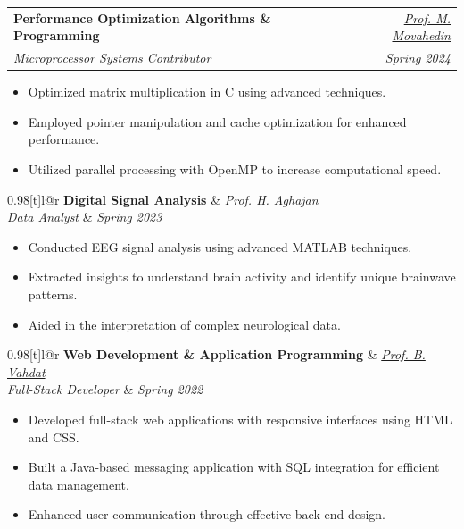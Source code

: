 \documentclass[a4paper,11pt]{article}
\makeatletter
\newcommand{\resumeSubheading}[4]{
\vspace{0.5mm}\item
    \begin{tabular*}{0.98\textwidth}[t]{l@{\extracolsep{\fill}}r}
        \textbf{#1} & \textit{\footnotesize{#4}} \\
        \textit{\footnotesize{#3}} &  \footnotesize{#2}\\
    \end{tabular*}
    \vspace{-2.4mm}
}
\newcommand{\resumeItemListStart}{\begin{justify}\begin{itemize}[leftmargin=3ex, rightmargin=2ex, noitemsep,labelsep=1.2mm,itemsep=0mm]\small}
\newcommand{\resumeItemListEnd}{\end{itemize}\end{justify}\vspace{-2mm}}
\makeatother
\begin{document}
    \vspace{-4.5mm}
    
    \resumeSubheading
      {Performance Optimization Algorithms \& Programming}{\textit{Spring 2024}}
      {Microprocessor Systems Contributor}{\textcolor{MidnightBlue}{\href{https://www.researchgate.net/profile/Mohammad-Movahedin}{Prof. M. Movahedin}}}
      \vspace{-2.0mm}
      \resumeItemListStart
        \item {Optimized matrix multiplication in C using advanced techniques.}
        \item {Employed pointer manipulation and cache optimization for enhanced performance.}
        \item {Utilized parallel processing with OpenMP to increase computational speed.}
      \resumeItemListEnd

    \vspace{-4.5mm}
    
    \resumeSubheading
      {Digital Signal Analysis}{\textit{Spring 2023}}
      {Data Analyst}{\textcolor{MidnightBlue}{\href{https://scholar.google.com/citations?user=bLuKrjgAAAAJ&hl=en}{Prof. H. Aghajan}}}
      \vspace{-2.0mm}
      \resumeItemListStart
        \item {Conducted EEG signal analysis using advanced MATLAB techniques.}
        \item {Extracted insights to understand brain activity and identify unique brainwave patterns.}
        \item {Aided in the interpretation of complex neurological data.}
      \resumeItemListEnd
    
    \vspace{-4.5mm}
    
    \resumeSubheading
      {Web Development \& Application Programming}{\textit{Spring 2022}}
      {Full-Stack Developer}{\textcolor{MidnightBlue}{\href{https://scholar.google.com/citations?user=8hv_HpKBHhoC&hl=en}{Prof. B. Vahdat}}}
      \vspace{-2.0mm}
      \resumeItemListStart
        \item {Developed full-stack web applications with responsive interfaces using HTML and CSS.}
        \item {Built a Java-based messaging application with SQL integration for efficient data management.}
        \item {Enhanced user communication through effective back-end design.}
      \resumeItemListEnd
\end{document}
